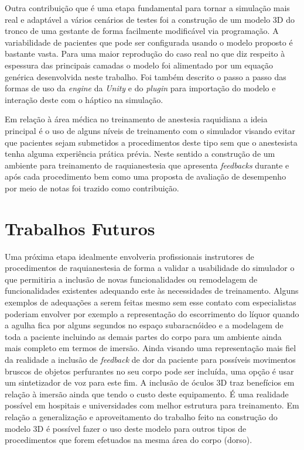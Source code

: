 Outra contribuição que é uma etapa fundamental para tornar a simulação mais real e adaptável a vários cenários de testes foi a construção de um modelo 3D do tronco de uma gestante de forma facilmente modificável via programação. A variabilidade de pacientes que pode ser configurada usando o modelo proposto é bastante vasta. Para uma maior reprodução do caso real no que diz respeito à espessura das principais camadas o modelo foi alimentado por um equação genérica desenvolvida neste trabalho. Foi também descrito o passo a passo das formas de uso da \textit{engine} da \textit{Unity} e do \textit{plugin} para importação do modelo e interação deste com o háptico na simulação. 

Em relação à área médica no treinamento de anestesia raquidiana a ideia principal é o uso de alguns níveis de treinamento com o simulador visando evitar que pacientes sejam submetidos a procedimentos deste tipo sem que o anestesista tenha alguma experiência prática prévia. Neste sentido a construção de um ambiente para treinamento de raquianestesia que apresenta \textit{feedbacks} durante e após cada procedimento bem como uma proposta de avaliação de desempenho por meio de notas foi trazido como contribuição. 

\section{Trabalhos Futuros}
\label{sec:trabFuturo}

Uma próxima etapa idealmente envolveria profissionais instrutores de procedimentos de raquianestesia de forma a validar a usabilidade do simulador o que permitiria a inclusão de novas funcionalidades ou remodelagem de funcionalidades existentes adequando este às necessidades de treinamento. Alguns exemplos de adequações a serem feitas mesmo sem esse contato com especialistas poderiam envolver por exemplo a representação do escorrimento do líquor quando a agulha fica por alguns segundos no espaço subaracnóideo e a modelagem de toda a paciente incluindo as demais partes do corpo para um ambiente ainda mais completo em termos de imersão. Ainda visando uma representação mais fiel da realidade a inclusão de \textit{feedback} de dor da paciente para possíveis movimentos bruscos de objetos perfurantes no seu corpo pode ser incluída, uma opção é usar um sintetizador de voz para este fim. A inclusão de óculos 3D traz benefícios em relação à imersão ainda que tendo o custo deste equipamento. É uma realidade possível em hospitais e universidades com melhor estrutura para treinamento.
Em relação a generalização e aproveitamento do trabalho feito na construção do modelo 3D é possível fazer o uso deste modelo para outros tipos de procedimentos que forem efetuados na mesma área do corpo (dorso). 

